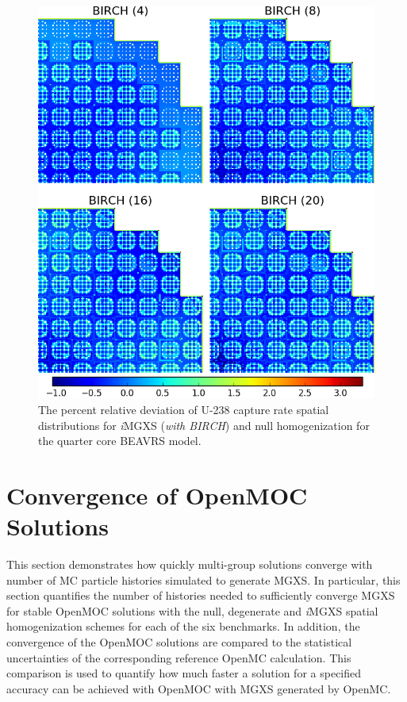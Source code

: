 \begin{figure}[h!]
\centering
\includegraphics[width=0.9\linewidth]{figures/results/compare/full-core/compare-capt-birch}
\vspace{2mm}
\caption[U-238 capture rate \textit{i}MGXS-to-null relative deviations]{The percent relative deviation of U-238 capture rate spatial distributions for \textit{i}\ac{MGXS} (\textit{with BIRCH}) and null homogenization for the quarter core BEAVRS model.}
\label{fig:chap11-full-core-capt-rates-birch-comp}
\end{figure}

\clearpage


\section{Convergence of OpenMOC Solutions}
\label{sec:chap11-converge}

This section demonstrates how quickly multi-group solutions converge with number of \ac{MC} particle histories simulated to generate \ac{MGXS}. In particular, this section quantifies the number of histories needed to sufficiently converge \ac{MGXS} for stable OpenMOC solutions with the null, degenerate and \textit{i}\ac{MGXS} spatial homogenization schemes for each of the six benchmarks. In addition, the convergence of the OpenMOC solutions are compared to the statistical uncertainties of the corresponding reference OpenMC calculation. This comparison is used to quantify how much faster a solution for a specified accuracy can be achieved with OpenMOC with \ac{MGXS} generated by OpenMC.

